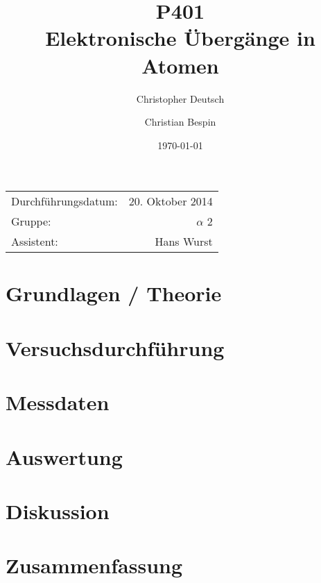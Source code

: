 \documentclass[10pt, a4paper]{article}
\title{P401 \\ Elektronische Übergänge in Atomen}
\author{Christopher Deutsch \and Christian Bespin}
\date{\today}
\begin{document}
  
\maketitle

\begin{center}
\begin{tabular}{l r}
Durchführungsdatum: & 20. Oktober 2014 \\
Gruppe: & $\alpha$ 2 \\
Assistent: & Hans Wurst
\end{tabular}
\end{center}


\begin{abstract}
\end{abstract}

\section{Grundlagen / Theorie}

\section{Versuchsdurchführung}

\section{Messdaten}

\section{Auswertung}

\section{Diskussion}

\section{Zusammenfassung}

\end{document}
